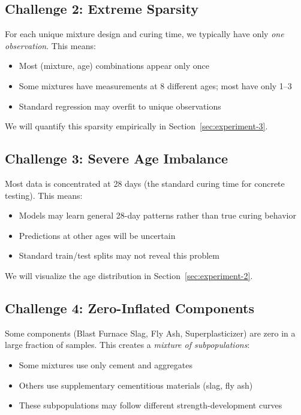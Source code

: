 \documentclass[11pt]{article}
\begin{document}
\subsection{Challenge 2: Extreme Sparsity}

For each unique mixture design and curing time, we typically have only \emph{one observation}.  This means:
\begin{itemize}[nosep]
  \item Most (mixture, age) combinations appear only once
  \item Some mixtures have measurements at 8 different ages; most have only 1--3
  \item Standard regression may overfit to unique observations
\end{itemize}

We will quantify this sparsity empirically in Section~\ref{sec:experiment-3}.

\subsection{Challenge 3: Severe Age Imbalance}

Most data is concentrated at 28 days (the standard curing time for concrete testing).  This means:
\begin{itemize}[nosep]
  \item Models may learn general 28-day patterns rather than true curing behavior
  \item Predictions at other ages will be uncertain
  \item Standard train/test splits may not reveal this problem
\end{itemize}

We will visualize the age distribution in Section~\ref{sec:experiment-2}.

\subsection{Challenge 4: Zero-Inflated Components}

Some components (Blast Furnace Slag, Fly Ash, Superplasticizer) are zero in a large fraction of samples.  This creates a \emph{mixture of subpopulations}:
\begin{itemize}[nosep]
  \item Some mixtures use only cement and aggregates
  \item Others use supplementary cementitious materials (slag, fly ash)
  \item These subpopulations may follow different strength-development curves
\end{itemize}
\end{document}

